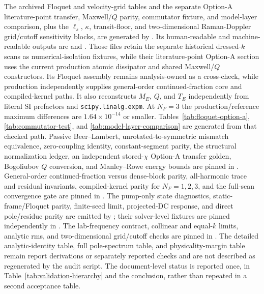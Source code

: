\documentclass[11pt,a4paper]{article}
\begin{document}
The archived Floquet and velocity-grid tables and the separate Option-A
literature-point transfer, Maxwell/$Q$ parity, commutator fixture, and model-layer
comparison, plus the $\ell_s$, $\kappa$, transit-floor, and two-dimensional
Raman-Doppler grid/cutoff sensitivity blocks,
are generated by
.
Its human-readable and machine-readable outputs are
 and
. Those files retain the separate
historical dressed-$k$ scans as numerical-isolation fixtures, while their
literature-point Option-A section uses the current production atomic dissipator
and shared Maxwell/$Q$ constructors. Its Floquet assembly remains analysis-owned
as a cross-check, while production independently supplies general-order
continued-fraction core and compiled-kernel paths. It also reconstructs $M_E$,
$Q$, and $T_E$ independently from literal SI prefactors and
\texttt{scipy.linalg.expm}. At $N_F=3$ the production/reference maximum
differences are $1.64\times10^{-14}$ or smaller. Tables~\ref{tab:floquet-option-a},
\ref{tab:commutator-test}, and \ref{tab:model-layer-comparison} are generated
from that checked path. Passive Beer--Lambert, unrotated-to-symmetric mismatch
equivalence, zero-coupling identity, constant-segment parity, the structural
normalization ledger, an independent stored-$\chi$ Option-A transfer golden,
Bogoliubov $Q$ conversion, and Manley--Rowe energy bounds are pinned in
.
General-order continued-fraction versus dense-block parity, all-harmonic trace
and residual invariants, compiled-kernel parity for $N_F=1,2,3$, and the
full-scan convergence gate are pinned in .
The pump-only state diagnostics, static-frame/Floquet parity, finite-seed limit,
projected-DC response, and direct pole/residue parity are emitted by
; their solver-level fixtures are pinned independently
in .
The lab-frequency contract, collinear and equal-$k$ limits, analytic rms, and
two-dimensional grid/cutoff checks are pinned in
. The detailed analytic-identity table,
full pole-spectrum table, and physicality-margin table remain report derivations
or separately reported checks and are not described as regenerated by the audit
script.
The document-level status is reported once, in
Table~\ref{tab:validation-hierarchy} and the conclusion, rather than repeated
in a second acceptance table.
\end{document}
